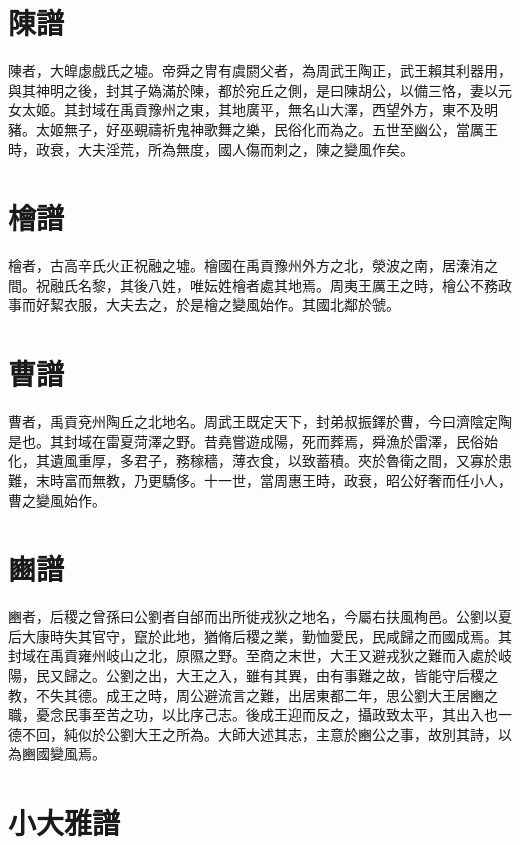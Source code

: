 \section*{陳譜}

陳者，大皥虙戲氏之墟。帝舜之冑有虞閼父者，為周武王陶正，武王賴其利器用，與其神明之後，封其子媯滿於陳，都於宛丘之側，是曰陳胡公，以備三恪，妻以元女太姬。其封域在禹貢豫州之東，其地廣平，無名山大澤，西望外方，東不及明豬。太姬無子，好巫覡禱祈鬼神歌舞之樂，民俗化而為之。五世至幽公，當厲王時，政衰，大夫淫荒，所為無度，國人傷而刺之，陳之變風作矣。

\section*{檜譜}

檜者，古高辛氏火正祝融之墟。檜國在禹貢豫州外方之北，滎波之南，居溱洧之間。祝融氏名黎，其後八姓，唯妘姓檜者處其地焉。周夷王厲王之時，檜公不務政事而好絜衣服，大夫去之，於是檜之變風始作。其國北鄰於虢。

\section*{曹譜}

曹者，禹貢兗州陶丘之北地名。周武王既定天下，封弟叔振鐸於曹，今曰濟陰定陶是也。其封域在雷夏菏澤之野。昔堯嘗遊成陽，死而葬焉，舜漁於雷澤，民俗始化，其遺風重厚，多君子，務稼穡，薄衣食，以致蓄積。夾於魯衛之間，又寡於患難，末時富而無教，乃更驕侈。十一世，當周惠王時，政衰，昭公好奢而任小人，曹之變風始作。

\section*{豳譜}

豳者，后稷之曾孫曰公劉者自邰而出所徙戎狄之地名，今屬右扶風栒邑。公劉以夏后大康時失其官守，竄於此地，猶脩后稷之業，勤恤愛民，民咸歸之而國成焉。其封域在禹貢雍州岐山之北，原隰之野。至商之末世，大王又避戎狄之難而入處於岐陽，民又歸之。公劉之出，大王之入，雖有其異，由有事難之故，皆能守后稷之教，不失其德。成王之時，周公避流言之難，出居東都二年，思公劉大王居豳之職，憂念民事至苦之功，以比序己志。後成王迎而反之，攝政致太平，其出入也一德不回，純似於公劉大王之所為。大師大述其志，主意於豳公之事，故別其詩，以為豳國變風焉。

\section*{小大雅譜}

